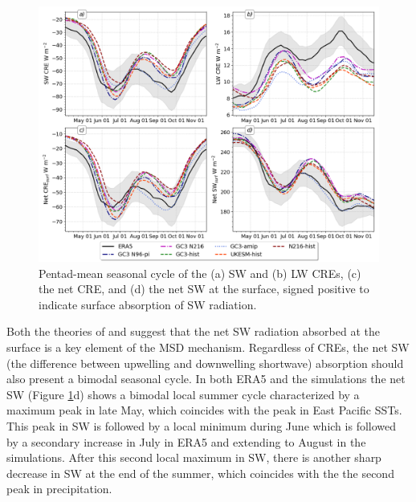 \begin{figure}[t!]
\includegraphics[width=\linewidth]{figures/cre_index_seasonal.png}
\caption[Seasonal cycle of cloud-radiative effects]{Pentad-mean seasonal cycle of the (a) SW and (b)  LW CREs, (c) the net CRE, and (d) the net SW at the surface, signed positive to indicate surface absorption of SW radiation.}
\label{fig:cre_seasonal}
\end{figure}

Both the theories of \cite{magana1999} and \cite{karnauskas2013} suggest that the net SW radiation absorbed at the surface is a key element of the MSD mechanism. Regardless of CREs, the net SW (the difference between upwelling and downwelling shortwave) absorption should also present a bimodal seasonal cycle.
In both ERA5 and the simulations the net SW (Figure \ref{fig:cre_seasonal}d) shows a bimodal local summer cycle characterized by a maximum peak in late May, which coincides with the peak in East Pacific SSTs. This peak in SW is followed by a local minimum during June which is followed by a secondary increase in July in ERA5 and extending to August in the simulations. After this second local maximum in SW, there is another sharp decrease in SW at the end of the summer, which coincides with the the second peak in precipitation. 

